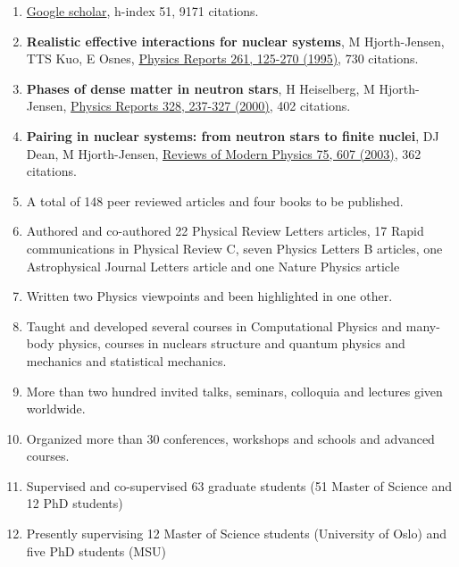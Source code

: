 \documentclass[a4wide,10pt]{article}
\begin{document}
\begin{enumerate}
\item \href{{https://scholar.google.com/citations?user=nuiyEmwAAAAJ&hl=en}}{Google scholar}, h-index 51, 9171 citations.

\item \textbf{Realistic effective interactions for nuclear systems}, M Hjorth-Jensen, TTS Kuo, E Osnes, \href{{http://www.sciencedirect.com/science/article/pii/0370157395000126}}{Physics Reports 261, 125-270 (1995)}, 730 citations.

\item \textbf{Phases of dense matter in neutron stars}, H Heiselberg, M Hjorth-Jensen, \href{{http://www.sciencedirect.com/science/article/pii/S0370157399001106}}{Physics Reports 328, 237-327 (2000)}, 402 citations.

\item \textbf{Pairing in nuclear systems: from neutron stars to finite nuclei}, DJ Dean, M Hjorth-Jensen, \href{{http://journals.aps.org/rmp/abstract/10.1103/RevModPhys.75.607}}{Reviews of Modern Physics 75, 607  (2003)}, 362 citations.

\item A total of 148 peer reviewed articles and four books to be published.

\item Authored and co-authored 22 Physical Review Letters articles, 17 Rapid communications in Physical Review C, seven Physics Letters B articles, one Astrophysical Journal Letters article and one Nature Physics article

\item Written two Physics viewpoints and been highlighted in one other.

\item Taught and developed several courses in Computational Physics and many-body physics, courses in nuclears structure and quantum physics and mechanics and statistical mechanics.

\item More than two hundred invited talks, seminars, colloquia and lectures given worldwide.

\item Organized more than 30 conferences, workshops and schools and advanced courses.

\item Supervised and co-supervised 63 graduate students (51 Master of Science and 12 PhD students)

\item Presently supervising 12 Master of Science students (University of Oslo) and five PhD students (MSU)
\end{enumerate}
\end{document}
